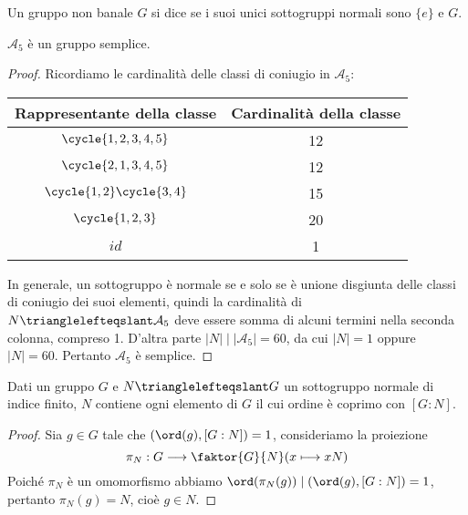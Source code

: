 \documentclass[11pt]{scrartcl}
\begin{document}
	\begin{definition}
		Un gruppo non banale $G$ si dice  se i suoi unici sottogruppi
		normali sono $\{e\}$ e $G$.
	\end{definition}
	
	
	\begin{proposition}
		\label{prop1.61}
		$\mathcal{A}_5$ è un gruppo semplice.
	\end{proposition}
	
	\begin{proof}
		Ricordiamo le cardinalità delle classi di coniugio in $\mathcal{A}_5$:
		
		
		\begingroup
		\renewcommand{\arraystretch}{1.5}
		\begin{center}
			\begin{tabular}{c|c}
				Rappresentante della classe & Cardinalità della classe\\
				\hline
				$\cycle{1, 2, 3, 4, 5}$ & 12\\
				$\cycle{2, 1, 3, 4, 5}$ & 12\\
				$\cycle{1, 2}\cycle{3, 4}$ & 15\\
				$\cycle{1, 2, 3}$ & 20\\
				$id$ & 1 
			\end{tabular}
		\end{center}
		\endgroup
		In generale, un sottogruppo è normale se e solo se è unione disgiunta
		delle classi di coniugio dei suoi elementi, quindi la cardinalità
		di $N \trianglelefteqslant \mathcal{A}_5$ deve essere somma di alcuni 
		termini nella seconda colonna, compreso 1. D'altra parte $|N| \mid |\mathcal{A}_5| = 60$,
		da cui $|N| = 1$ oppure $|N| = 60$. Pertanto $\mathcal{A}_5$ è semplice.
	\end{proof}
	
	\begin{lemma}
		\label{lemma1.62}
		Dati un gruppo $G$ e $N\trianglelefteqslant G$ un sottogruppo normale di 
		indice finito, $N$ contiene ogni elemento di $G$ il cui ordine è coprimo
		con $[G:N]$.
	\end{lemma}
	
	\begin{proof}
		Sia $g \in G$ tale che $(\ord(g), [G:N]) = 1$, consideriamo la proiezione
		\[
		\pi_N:G \longrightarrow \faktor{G}{N} (x \longmapsto xN)
		\]
		Poiché $\pi_N$ è un omomorfismo abbiamo $\ord(\pi_N(g)) \mid (\ord(g), [G:N]) = 1$,
		pertanto $\pi_N(g) = N$, cioè $g \in N$.
	\end{proof}
	
\end{document}
